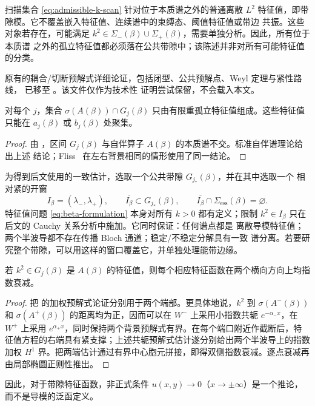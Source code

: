 \begin{remark}[嵌入与阈值现象]
扫描集合 \eqref{eq:admissible-k-scan} 针对位于本质谱之外的普通离散 $L^2$
特征值，即带隙模。它不覆盖嵌入特征值、连续谱中的束缚态、阈值特征值或带边
共振。这些对象若存在，可能满足
$k^2\in\Sigma_-(\beta)\cup\Sigma_+(\beta)$，需要单独分析。因此，所有位于本质谱
之外的孤立特征值都必须落在公共带隙中；该陈述并非对所有可能特征值的分类。
\end{remark}

原有的耦合/切断预解式详细论证，包括闭型、公共预解点、Weyl 定理与紧性路线，
已移至
。该文件仅作为技术性
证明尝试保留，不会载入本文。

\begin{proposition}[公共带隙中的离散谱]
\label{prop:gap-discrete-spectrum}
对每个 $j$，集合 $\sigma(A(\beta))\cap G_j(\beta)$ 只由有限重孤立特征值组成。这些特征值只能在
$a_j(\beta)$ 或 $b_j(\beta)$ 处聚集。
\end{proposition}
\begin{proof}
由 ，区间 $G_j(\beta)$ 与自伴算子
$A(\beta)$ 的本质谱不交。标准自伴谱理论给出上述
结论；Fliss~\cite[Proposition~3.3]{Fliss2013} 在左右背景相同的情形使用了同一结论。
\end{proof}

为得到后文使用的一致估计，选取一个公共带隙 $G_{j_*}(\beta)$，并在其中选取一个
相对紧的开窗
\begin{equation}
  I_\beta=(\lambda_-,\lambda_+),\qquad
  \overline{I_\beta}\subset G_{j_*}(\beta),\qquad
  \overline{I_\beta}\cap\Sigma_{\mathrm{ess}}(\beta)=\varnothing.
  \label{eq:strict-gap}
\end{equation}
特征值问题 \eqref{eq:beta-formulation} 本身对所有 $k>0$ 都有定义；限制
$k^2\in I_\beta$ 只在后文的 Cauchy 关系分析中施加。它同时保证：任何谱点都是
离散导模特征值；两个半波导都不存在传播 Bloch 通道；稳定/不稳定分解具有一致
谱分离。若要研究整个带隙，可以用这样的窗口覆盖它，并单独处理能带边缘。

\begin{proposition}[两个不同半波导情形下的局域化]
\label{prop:asymmetric-localization}
若 $k^2\in G_j(\beta)$ 是 $A(\beta)$ 的特征值，则每个相应特征函数在两个横向方向上均指数衰减。
\end{proposition}
\begin{proof}
把 \cite[Proposition~3.3 and Theorem~3.5]{Fliss2013} 的加权预解式论证分别用于两个端部。更具体地说，$k^2$ 到 $\sigma(A^-(\beta))$ 和 $\sigma(A^+(\beta))$ 的距离均为正，因而可以在 $W^-$ 上采用小指数共轭 $e^{-\alpha_-x}$，在 $W^+$ 上采用 $e^{\alpha_+x}$，同时保持两个背景预解式有界。在每个端口附近作截断后，特征值方程的右端具有紧支撑；上述共轭预解式估计遂分别给出两个半波导上的指数加权 $H^1$ 界。把两端估计通过有界中心胞元拼接，即得双侧指数衰减。逐点衰减再由局部椭圆正则性推出。
\end{proof}

因此，对于带隙特征函数，非正式条件 $u(x,y)\to0$（$x\to\pm\infty$）是一个推论，而不是导模的泛函定义。
